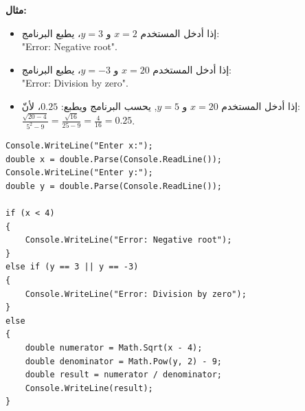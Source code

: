 \documentclass[14pt]{extarticle}
\begin{document}
\textbf{مثال:}
\begin{itemize}[nosep]
    \item إذا أدخل المستخدم $x = 2$ و $y = 3$، يطبع البرنامج: \\
    \textenglish{"Error: Negative root"}.
    \item إذا أدخل المستخدم $x = 20$ و $y = -3$، يطبع البرنامج: \\
    \textenglish{"Error: Division by zero"}.
    \item إذا أدخل المستخدم $x = 20$ و $y = 5$, يحسب البرنامج ويطبع: $0.25$، لأنّ: \\
    $\frac{\sqrt{20 - 4}}{5^2 - 9} = \frac{\sqrt{16}}{25 - 9} = \frac{4}{16} = 0.25$.
\end{itemize}

\ifwithsols
\begin{boxSolution}
\begin{english}
\begin{verbatim}
Console.WriteLine("Enter x:");
double x = double.Parse(Console.ReadLine());
Console.WriteLine("Enter y:");
double y = double.Parse(Console.ReadLine());

if (x < 4)
{
    Console.WriteLine("Error: Negative root");
}
else if (y == 3 || y == -3)
{
    Console.WriteLine("Error: Division by zero");
}
else
{
    double numerator = Math.Sqrt(x - 4);
    double denominator = Math.Pow(y, 2) - 9;
    double result = numerator / denominator;
    Console.WriteLine(result);
}
\end{verbatim}
\end{english}
\end{boxSolution}
\fi
\filbreak

\end{document}
